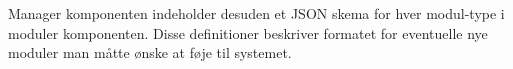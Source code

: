 Manager komponenten indeholder desuden et JSON skema for hver modul-type i moduler komponenten.
Disse definitioner beskriver formatet for eventuelle nye moduler man måtte ønske at føje til systemet.

